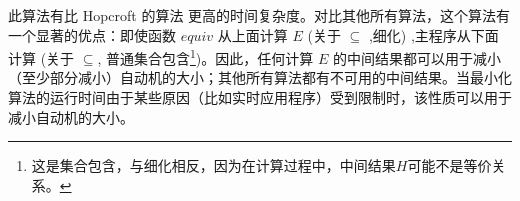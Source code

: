 
此算法有比 Hopcroft 的算法 \cite{Hopc71,Grie73} 更高的时间复杂度。对比其他所有算法，这个算法有一个显著的优点：即使函数 $equiv$ 从上面计算 $E$ (关于 $\subseteq$ ,细化) ,主程序从下面计算 (关于 $ \subseteq $, 普通集合包含\footnote{这是集合包含，与细化相反，因为在计算过程中，中间结果$H$可能不是等价关系。})。因此，任何计算 $E$ 的中间结果都可以用于减小（至少部分减小）自动机的大小；其他所有算法都有不可用的中间结果。当最小化算法的运行时间由于某些原因（比如实时应用程序）受到限制时，该性质可以用于减小自动机的大小。
